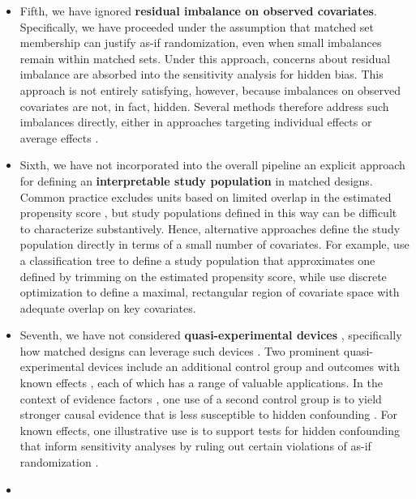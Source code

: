 \documentclass[
  12pt,
  leqno]{article}
\begin{document}
\begin{itemize}
  \citep{hansensales2015}.
\item
  Fifth, we have ignored \textbf{residual imbalance on observed
  covariates}. Specifically, we have proceeded under the assumption that
  matched set membership can justify as-if randomization, even when
  small imbalances remain within matched sets. Under this approach,
  concerns about residual imbalance are absorbed into the sensitivity
  analysis for hidden bias. This approach is not entirely satisfying,
  however, because imbalances on observed covariates are not, in fact,
  hidden. Several methods therefore address such imbalances directly,
  either in approaches targeting individual effects
  \citep{rosenbaum1988, pimentelhuang2024, chenetal2023, hengetal2025}
  or average effects \citep{zhuetal2025}.
\item
  Sixth, we have not incorporated into the overall pipeline an explicit
  approach for defining an \textbf{interpretable study population} in
  matched designs. Common practice excludes units based on limited
  overlap in the estimated propensity score
  \citep{crumpetal2009, kingzeng2006}, but study populations defined in
  this way can be difficult to characterize substantively. Hence,
  alternative approaches define the study population directly in terms
  of a small number of covariates. For example, \citet{traskinsmall2011}
  use a classification tree to define a study population that
  approximates one defined by trimming on the estimated propensity
  score, while \citet{fogartyetal2016} use discrete optimization to
  define a maximal, rectangular region of covariate space with adequate
  overlap on key covariates.
\item
  Seventh, we have not considered \textbf{quasi-experimental devices}
  \citep{campbell1957, campbellstanley1963, shadishetal2002},
  specifically how matched designs can leverage such devices
  \citep[see][Section IV]{rosenbaum2025}. Two prominent
  quasi-experimental devices include an additional control group
  \citep{rosenbaum1987b} and outcomes with known effects
  \citep{rosenbaum1989}, each of which has a range of valuable
  applications. In the context of evidence factors
  \citep{rosenbaum2021}, one use of a second control group is to yield
  stronger causal evidence that is less susceptible to hidden
  confounding \citep{rosenbaum2023b}. For known effects, one
  illustrative use is to support tests for hidden confounding that
  inform sensitivity analyses by ruling out certain violations of as-if
  randomization \citep{rosenbaum2023a}.
\item

\end{itemize}
\end{document}
